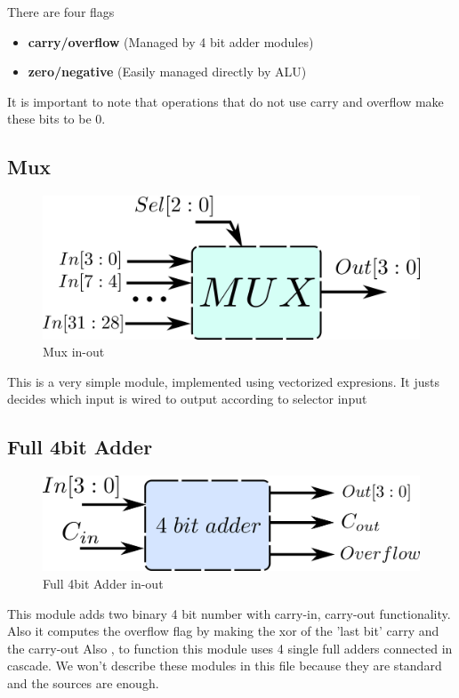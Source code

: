 There are four flags
\begin{itemize}
  \item \textbf{carry/overflow} (Managed by 4 bit adder modules)
  \item \textbf{zero/negative} (Easily managed directly by ALU)
\end{itemize}
It is important to note that operations that do not use carry and overflow make these bits to be 0.

\subsection*{Mux}
\begin{figure}[H]
  \begin{centering}
  \includegraphics[scale=1]{data/mux.png}
  \par\end{centering}
  \caption{Mux in-out}
\end{figure}

This is a very simple module, implemented using vectorized expresions. It justs decides which input is wired to output according to selector input

\subsection*{Full 4bit Adder}

\begin{figure}[H]
  \begin{centering}
  \includegraphics[scale=1]{data/4bitadder.png}
  \par\end{centering}
  \caption{Full 4bit Adder in-out}
\end{figure}

This module adds two binary 4 bit number with carry-in, carry-out functionality. Also it computes the overflow flag by making the xor of the 'last bit' carry and the carry-out
Also , to function this module uses 4 single full adders connected in 	
cascade. We won't describe these modules in this file because they are standard and the sources are enough.


